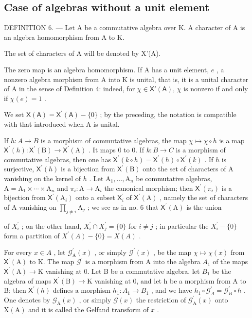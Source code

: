 \subsection{Case of algebras without a unit element}

DEFINITION 6. --- Let A be a commutative algebra over K. A character of A is an algebra homomorphism from A to K.

The set of characters of A will be denoted by X'(A).

The zero map is an algebra homomorphism. If A has a unit element, \(e\) , a nonzero algebra morphism from A into K is unital, that is, it is a unital character of A in the sense of Definition 4: indeed, for \(\chi \in \mathsf{X}'(\mathsf{A})\), \(\chi\) is nonzero if and only if \(\chi(e) = 1\) .

We set \(\mathsf{X}(\mathsf{A})=\mathsf{X}^{\prime}(\mathsf{A})-\{0\}\) ; by the preceding, the notation is compatible with that introduced when A is unital.

If \(h\colon A\to B\) is a morphism of commutative algebras, the map \(\chi\mapsto\chi\circ h\) is a map \(\mathsf{X}^{\prime}(h)\colon\mathsf{X}^{\prime}(\mathrm{B})\to\mathsf{X}^{\prime}(\mathrm{A})\) . It maps 0 to 0. If \(k\colon B\to C\) is a morphism of commutative algebras, then one has \(\mathsf{X}^{\prime}(k\circ h)=\mathsf{X}^{\prime}(h)\circ\mathsf{X}^{\prime}(k)\) . If \(h\) is surjective, \(\mathsf{X}^{\prime}(h)\) is a bijection from \(\mathsf{X}^{\prime}(\mathrm{B})\) onto the set of characters of A vanishing on the kernel of \(h\) . Let \(\mathrm{A}_{1},\ldots,\mathrm{A}_{n}\) be commutative algebras, \(\mathrm{A}=\mathrm{A}_{1}\times\cdots\times\mathrm{A}_{n}\) and \(\pi_{i}\colon\mathrm{A}\to\mathrm{A}_{i}\) the canonical morphism; then \(\mathsf{X}^{\prime}(\pi_{i})\) is a bijection from \(\mathsf{X}^{\prime}(\mathrm{A}_{i})\) onto a subset \(\mathsf{X}_{i}^{\prime}\) of \(\mathsf{X}^{\prime}(\mathrm{A})\) , namely the set of characters of A vanishing on \(\prod_{j\neq i}\mathrm{A}_{j}\) ; we see as in no. 6 that \(\mathsf{X}^{\prime}(\mathrm{A})\) is the union

of \(X_{i}^{\prime}\) ; on the other hand, \(X_{i}^{\prime} \cap X_{j}^{\prime} = \{0\}\) for \(i \neq j\) ; in particular the \(X_{i}^{\prime} - \{0\}\) form a partition of \(X^{\prime}(A) - \{0\} = X(A)\) .

For every \(x \in A\) , let \(\mathcal{G}_{\mathrm{A}}^{\prime}(x)\) , or simply \(\mathcal{G}^{\prime}(x)\) , be the map \(\chi \mapsto \chi(x)\) from \(\mathsf{X}^{\prime}(\mathrm{A})\) to K. The map \(\mathcal{G}^{\prime}\) is a morphism from A into the algebra \(A_{1}\) of the maps \(\mathsf{X}^{\prime}(\mathrm{A}) \to \mathrm{K}\) vanishing at 0. Let B be a commutative algebra, let \(B_{1}\) be the algebra of maps \(\mathsf{X}^{\prime}(\mathrm{B}) \to \mathrm{K}\) vanishing at 0, and let h be a morphism from A to B; then \(\mathsf{X}^{\prime}(h)\) defines a morphism \(h_{1}: A_{1} \to B_{1}\) , and we have \(h_{1} \circ \mathcal{G}_{A}^{\prime} = \mathcal{G}_{B}^{\prime} \circ h\) . One denotes by \(\mathcal{G}_{\mathrm{A}}(x)\) , or simply \(\mathcal{G}(x)\) the restriction of \(\mathcal{G}_{\mathrm{A}}^{\prime}(x)\) onto \(\mathrm{X}(\mathrm{A})\) and it is called the Gelfand transform of \(x\) .

